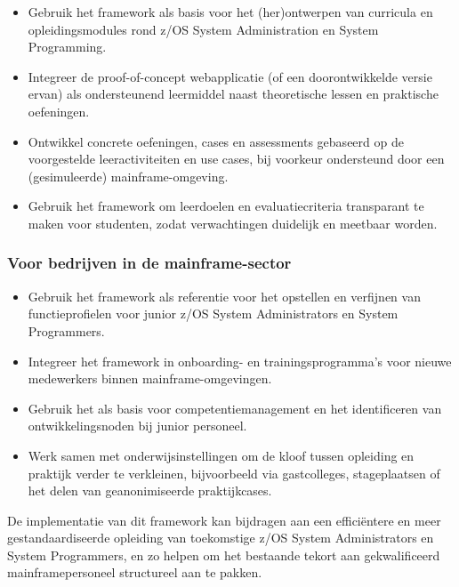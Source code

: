 \begin{itemize}
	\item Gebruik het framework als basis voor het (her)ontwerpen van curricula en opleidingsmodules rond z/OS System Administration en System Programming.
	
	\item Integreer de proof-of-concept webapplicatie (of een doorontwikkelde versie ervan) als ondersteunend leermiddel naast theoretische lessen en praktische oefeningen.
	
	\item Ontwikkel concrete oefeningen, cases en assessments gebaseerd op de voorgestelde leeractiviteiten en use cases, bij voorkeur ondersteund door een (gesimuleerde) mainframe-omgeving.
	
	\item Gebruik het framework om leerdoelen en evaluatiecriteria transparant te maken voor studenten, zodat verwachtingen duidelijk en meetbaar worden.
\end{itemize}

\subsubsection{Voor bedrijven in de mainframe-sector}

\begin{itemize}
	\item Gebruik het framework als referentie voor het opstellen en verfijnen van functieprofielen voor junior z/OS System Administrators en System Programmers.
	
	\item Integreer het framework in onboarding- en trainingsprogramma’s voor nieuwe medewerkers binnen mainframe-omgevingen.
	
	\item Gebruik het als basis voor competentiemanagement en het identificeren van ontwikkelingsnoden bij junior personeel.
	
	\item Werk samen met onderwijsinstellingen om de kloof tussen opleiding en praktijk verder te verkleinen, bijvoorbeeld via gastcolleges, stageplaatsen of het delen van geanonimiseerde praktijkcases.
\end{itemize}

De implementatie van dit framework kan bijdragen aan een efficiëntere en meer gestandaardiseerde opleiding van toekomstige z/OS System Administrators en System Programmers, en zo helpen om het bestaande tekort aan gekwalificeerd mainframepersoneel structureel aan te pakken.